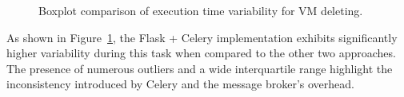 \begin{figure}[ht]
                \caption{Boxplot comparison of execution time variability for VM deleting.}
                \label{fig:task3_boxplot}
            \end{figure}

            As shown in Figure~\ref{fig:task3_boxplot}, the Flask + Celery implementation exhibits significantly higher variability 
            during this task when compared to the other two approaches. The presence of numerous outliers and a wide interquartile range 
            highlight the inconsistency introduced by Celery and the message broker's overhead.

